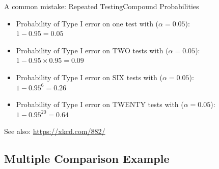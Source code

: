 \begin{frame}{A common mistake: Repeated Testing}{Compound Probabilities}
  \begin{itemize}
    \item Probability of Type I error on one test with ($\alpha = 0.05$):\\
     $1 - 0.95 = 0.05$
    \item Probability of Type I error on TWO tests with ($\alpha = 0.05$):\\
     $1 - 0.95\times 0.95 = 0.09$
    \item Probability of Type I error on SIX tests with ($\alpha = 0.05$):\\
     $1 - 0.95^{6} = 0.26$
    \item Probability of Type I error on TWENTY tests with ($\alpha = 0.05$):\\
     $1 - 0.95^{20} = 0.64$
  \end{itemize}\bigskip

  See also: \url{https://xkcd.com/882/}
\end{frame}


%
%




\subsection{Multiple Comparison Example}

